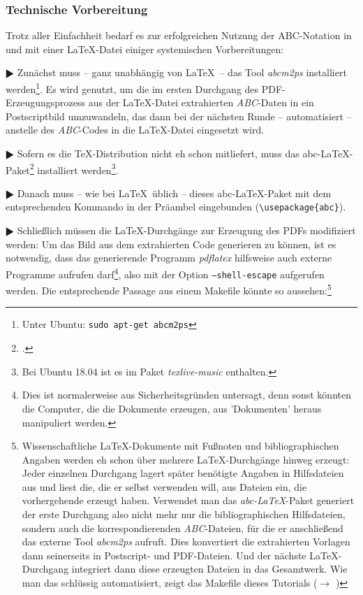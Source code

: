 \subsubsection{Technische Vorbereitung}

Trotz aller Einfachheit bedarf es zur erfolgreichen Nutzung der ABC-Notation
in und mit einer \LaTeX-Datei einiger systemischen Vorbereitungen:

$\RHD$ Zunächst muss -- ganz unabhängig von \LaTeX\ -- das Tool \textit{abcm2ps}
installiert werden\footnote{Unter Ubuntu: \texttt{sudo apt-get abcm2ps}}. Es
wird genutzt, um die im  ersten Durchgang des PDF-Erzeugungsprozess aus der
\LaTeX-Datei extrahierten \textit{ABC}-Daten in ein Postscriptbild
umzuwandeln, das dann bei der nächsten Runde -- automatisiert -- anstelle des
\textit{ABC}-Codes in die \LaTeX-Datei eingesetzt wird.
  
$\RHD$ Sofern es die \TeX-Distribution nicht eh schon mitliefert, muss das
abc-\LaTeX-Paket\footcite[vgl.][\nopage wp]{CtanAbc2018a} installiert
werden\footnote{Bei Ubuntu 18.04 ist es im Paket \textit{texlive-music} enthalten.}.
  
$\RHD$ Danach muss -- wie bei \LaTeX\ üblich -- dieses
abc-\LaTeX-Paket  mit dem entsprechenden Kommando in der Präambel
eingebunden (\texttt{\textbackslash{usepackage}\{abc\}}).
  
$\RHD$ Schließlich müssen die \LaTeX-Durchgänge zur Erzeugung des PDFs
modifiziert werden: Um das Bild aus dem extrahierten Code generieren zu können,
ist es notwendig, dass das generierende Programm \textit{pdflatex} hilfsweise auch
externe Programme aufrufen darf\footnote{Dies ist normalerweise aus
Sicherheitsgründen untersagt, denn sonst könnten die Computer, die die Dokumente
erzeugen, aus 'Dokumenten' heraus manipuliert werden.}, also mit der Option
\texttt{--shell-escape} aufgerufen werden. Die entsprechende Passage aus einem
Makefile könnte so aussehen:\footnote{Wissenschaftliche \LaTeX-Dokumente
mit Fußnoten und bibliographischen Angaben werden eh schon über mehrere
\LaTeX-Durchgänge hinweg erzeugt: Jeder einzelnen Durchgang lagert später
benötigte Angaben in Hilfsdateien aus und liest die, die er selbst verwenden
will, aus Dateien ein, die vorhergehende erzeugt haben.
Verwendet man das \textit{abc-LaTeX}-Paket generiert der erste Durchgang also
nicht mehr nur die bibliographischen Hilfsdateien, sondern auch die
korrespondierenden \textit{ABC}-Dateien, für die er anschließend das externe Tool
\textit{abcm2ps} aufruft. Dies konvertiert die extrahierten Vorlagen dann
seinerseits in Postscript- und PDF-Dateien. Und der nächste
\LaTeX-Durchgang integriert dann diese erzeugten Dateien in das
Gesamtwerk. Wie man das schlüssig automatisiert, zeigt das Makefile dieses
Tutorials ($\rightarrow$
) } 

